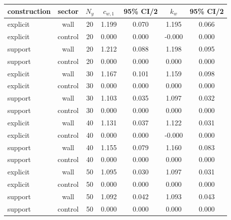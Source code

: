 \begin{ruledtabular}
\begin{tabular}{lcccccc}
\toprule
construction & sector & $N_y$ & $c_{w,1}$ & 95\% CI/2 & $k_w$ & 95\% CI/2 \\
\midrule
explicit & wall & 20 & 1.199 & 0.070 & 1.195 & 0.066 \\
explicit & control & 20 & 0.000 & 0.000 & -0.000 & 0.000 \\
support & wall & 20 & 1.212 & 0.088 & 1.198 & 0.095 \\
support & control & 20 & 0.000 & 0.000 & 0.000 & 0.000 \\
explicit & wall & 30 & 1.167 & 0.101 & 1.159 & 0.098 \\
explicit & control & 30 & 0.000 & 0.000 & 0.000 & 0.000 \\
support & wall & 30 & 1.103 & 0.035 & 1.097 & 0.032 \\
support & control & 30 & 0.000 & 0.000 & 0.000 & 0.000 \\
explicit & wall & 40 & 1.131 & 0.037 & 1.122 & 0.031 \\
explicit & control & 40 & 0.000 & 0.000 & -0.000 & 0.000 \\
support & wall & 40 & 1.155 & 0.079 & 1.160 & 0.083 \\
support & control & 40 & 0.000 & 0.000 & 0.000 & 0.000 \\
explicit & wall & 50 & 1.095 & 0.030 & 1.097 & 0.031 \\
explicit & control & 50 & 0.000 & 0.000 & 0.000 & 0.000 \\
support & wall & 50 & 1.092 & 0.042 & 1.093 & 0.043 \\
support & control & 50 & 0.000 & 0.000 & 0.000 & 0.000 \\
\bottomrule
\end{tabular}
\end{ruledtabular}

